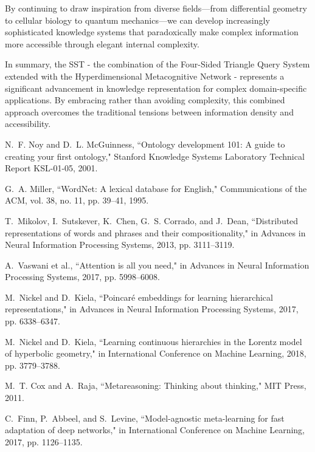 \documentclass[journal,onecolumn]{IEEEtran}
\begin{document}
By continuing to draw inspiration from diverse fields—from differential geometry to cellular biology to quantum mechanics—we can develop increasingly sophisticated knowledge systems that paradoxically make complex information more accessible through elegant internal complexity.

In summary, the SST - the combination of the Four-Sided Triangle Query System extended with the Hyperdimensional Metacognitive Network - represents a significant advancement in knowledge representation for complex domain-specific applications. By embracing rather than avoiding complexity, this combined approach overcomes the traditional tensions between information density and accessibility.


\begin{thebibliography}{00}

N.~F. Noy and D.~L. McGuinness, ``Ontology development 101: A guide to creating your first ontology," Stanford Knowledge Systems Laboratory Technical Report KSL-01-05, 2001.

G.~A. Miller, ``WordNet: A lexical database for English," Communications of the ACM, vol. 38, no. 11, pp. 39--41, 1995.

T.~Mikolov, I.~Sutskever, K.~Chen, G.~S. Corrado, and J.~Dean, ``Distributed representations of words and phrases and their compositionality," in Advances in Neural Information Processing Systems, 2013, pp. 3111--3119.

A.~Vaswani et al., ``Attention is all you need," in Advances in Neural Information Processing Systems, 2017, pp. 5998--6008.

M.~Nickel and D.~Kiela, ``Poincaré embeddings for learning hierarchical representations," in Advances in Neural Information Processing Systems, 2017, pp. 6338--6347.

M.~Nickel and D.~Kiela, ``Learning continuous hierarchies in the Lorentz model of hyperbolic geometry," in International Conference on Machine Learning, 2018, pp. 3779--3788.

M.~T. Cox and A.~Raja, ``Metareasoning: Thinking about thinking," MIT Press, 2011.

C.~Finn, P.~Abbeel, and S.~Levine, ``Model-agnostic meta-learning for fast adaptation of deep networks," in International Conference on Machine Learning, 2017, pp. 1126--1135.


\end{thebibliography}
\end{document}
